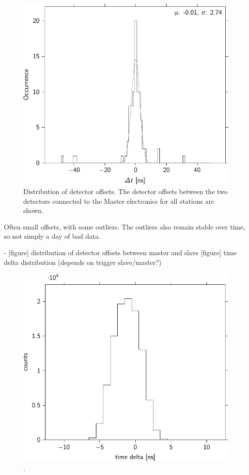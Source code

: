 \begin{figure}
    \centering
    \includegraphics{plots/station/detector_offset_distribution}
    \caption{Distribution of detector offsets. The detector offsets between the two detectors connected to the Master electronics for all \hisparc stations are shown.}
    \label{fig:detector_offset_distribution}
\end{figure}

  Often small offsets, with some outliers. The outliers also remain stable
  over time, so not simply a day of bad data.

- [figure] distribution of detector offsets between master and slave
  [figure] time delta distribution (depends on trigger slave/master?)


\begin{figure}
    \centering
    \includegraphics{plots/station/time_delta_501}
    \caption{.}
    \label{fig:time_delta_501}
\end{figure}


